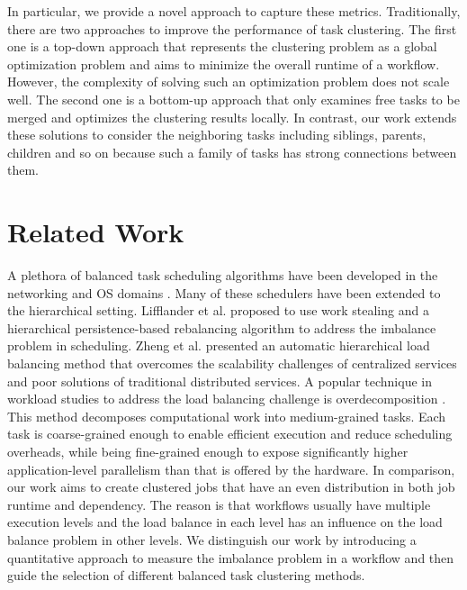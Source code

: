 In particular, we provide a novel approach to capture these metrics. Traditionally, there are two approaches to improve the performance of task clustering. The first one is a top-down approach \cite{Integration2012} that represents the clustering problem as a global optimization problem and aims to minimize the overall runtime of a workflow. However, the complexity of solving such an optimization problem does not scale well. The second one is a bottom-up approach \cite{Muthuvelu2005}\cite{Liu2009} that only examines free tasks to be merged and optimizes the clustering results locally. In contrast, our work extends these solutions to consider the neighboring tasks including siblings, parents, children and so on because such a family of tasks has strong connections between them. 


\section{Related Work}

A plethora of balanced task scheduling algorithms have been developed in the networking and OS domains \cite{Lifflander2012, Zheng2011}. Many of these schedulers have been extended to the hierarchical setting. Lifflander et al. \cite{Lifflander2012} proposed to use work stealing and a hierarchical persistence-based rebalancing algorithm to address the imbalance problem in scheduling. Zheng et al. \cite{Zheng2011} presented an automatic hierarchical load balancing method that overcomes the scalability challenges of centralized services and poor solutions of traditional distributed services. A popular technique in workload studies  to address the load balancing challenge is overdecomposition \cite{Lifflander2012}. This method decomposes computational work into medium-grained tasks. Each task is coarse-grained enough to enable efficient execution and reduce scheduling overheads, while being fine-grained enough to expose significantly higher application-level parallelism than that is offered by the hardware. In comparison, our work aims to create clustered jobs that have an even distribution in both job runtime and dependency. The reason is that workflows usually have multiple execution levels and the load balance in each level has an influence on the load balance problem in other levels. We distinguish our work by introducing a quantitative approach to measure the imbalance problem in a workflow and then guide the selection of different balanced task clustering methods. 


